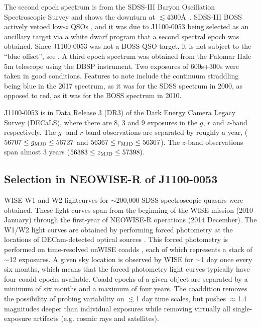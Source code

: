 \documentclass[11pt,a4paper]{article}
\begin{document}
The second epoch spectrum is from the SDSS-III Baryon Oscillation Spectroscopic Survey \citep[BOSS; ][]{Dawson2013} and shows the downturn at $\lesssim$4300\AA\ .  SDSS-III BOSS actively vetoed low-$z$ QSOs \citep{Ross2012}, and it was due to J1100-0053 being selected as an ancillary target via a white dwarf program \citep{Kepler2015, Kepler2016} that a second spectral epoch was obtained. Since J1100-0053 was not a BOSS QSO target, it is not subject to the ``blue offset'', see \citet{Margala2016}. A third epoch spectrum was obtained from the Palomar Hale 5m telescope using the DBSP instrument.  Two exposures of 600s+300s were taken in good conditions. Features to note include the continuum straddling \mgii being blue in the 2017 spectrum, as it was for the SDSS spectrum in 2000, as opposed to red, as it was for the BOSS spectrum in 2010.

J1100-0053 is in Data Release 3 (DR3) of the Dark Energy Camera Legacy Survey (DECaLS), where there are 8, 3 and 9 exposures in the $g$, $r$ and $z$-band respectively. The $g$- and $r$-band observations are separated by roughly a year, ($56707 \leq g_{\rm MJD} \leq 56727$ and $56367 \leq r_{\rm MJD} \leq 56367$). The $z$-band observations span almost 3 years ($56383 \leq z_{\rm MJD} \leq 57398)$.


\subsection*{Selection in NEOWISE-R of J1100-0053}
WISE W1 and W2 lightcurves for $\sim$200,000 SDSS spectroscopic quasars were obtained. These light curves span from the beginning of the WISE mission (2010 January) through the first-year of NEOWISE-R operations (2014 December). The W1/W2 light curves are obtained by performing forced photometry at the locations of DECam-detected optical sources \citep{Lang2014, Meisner2017a, Meisner2017b}. This forced photometry is performed on time-resolved unWISE coadds \citep{Lang2014}, each of which represents a stack of $\sim$12 exposures. A given sky location is observed by WISE for $\sim$1 day once every six months, which means that the forced photometry light curves typically have four coadd epochs available. Coadd epochs of a given object are separated by a minimum of six months and a maximum of four years. The coaddition removes the possibility of probing variability on $\lesssim$1 day time scales, but pushes $\approx$1.4 magnitudes deeper than individual exposures while removing virtually all single-exposure artifacts (e.g. cosmic rays and satellites).
\end{document}
